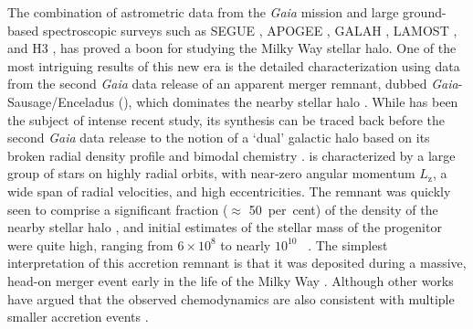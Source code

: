 The combination of astrometric data from the \textit{Gaia} mission \parencite{gaia} and large ground-based spectroscopic surveys such as SEGUE \parencite{segue}, APOGEE \parencite{apogee}, GALAH \parencite{galah}, LAMOST \parencite{lamost}, and H3 \parencite{h3}, has proved a boon for studying the Milky Way stellar halo. One of the most intriguing results of this new era is the detailed characterization using data from the second \textit{Gaia} data release of an apparent merger remnant, dubbed \textit{Gaia}-Sausage/Enceladus (\gse), which dominates the nearby stellar halo \parencite{belokurov18,haywood18,helmi18}. While \gse has been the subject of intense recent study, its synthesis can be traced back before the second \textit{Gaia} data release to the notion of a `dual' galactic halo based on its broken radial density profile and bimodal chemistry \parencite[e.g.][]{carollo07,nissen10,deason11,bonaca17,hayes18}. \gse is characterized by a large group of stars on highly radial orbits, with near-zero angular momentum $L_\mathrm{z}$, a wide span of radial velocities, and high eccentricities. The remnant was quickly seen to comprise a significant fraction ($\approx$ 50~per~cent) of the density of the nearby stellar halo \parencite{belokurov18,fattahi19,lancaster19}, and initial estimates of the stellar mass of the progenitor were quite high, ranging from $6\times10^{8}$ to nearly $10^{10}$ \Msun\ \parencite{helmi18,belokurov18,vincenzo19,feuillet20,fattahi19,myeong19,das20}. The simplest interpretation of this accretion remnant is that it was deposited during a massive, head-on merger event early in the life of the Milky Way \parencite{helmi18,belokurov18,iorio19,deason19,fattahi19,mackereth19a}. Although other works have argued that the observed chemodynamics are also consistent with multiple smaller accretion events \parencite{donlon22,donlon23}.

